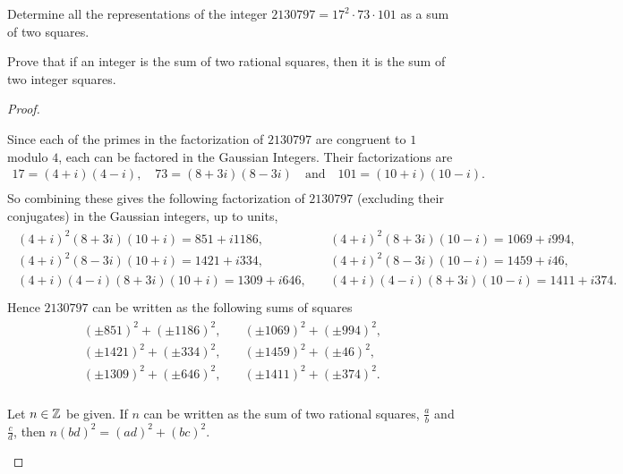 \documentclass[10pt]{amsart}
\begin{document}
\begin{thm}
  \begin{alphaenum}
  \item
    Determine all the representations of the integer $2130797 = 17^2 \cdot 73 \cdot 101$ as a sum of two squares.
  \item
    Prove that if an integer is the sum of two rational squares, then it is the sum of two integer squares.
  \end{alphaenum}
  \begin{proof}
    \begin{alphaenum}
    \item
      Since each of the primes in the factorization of $2130797$ are congruent to $1$ modulo $4$, each can be factored in the Gaussian Integers.
      Their factorizations are 
      \begin{align*}
        17 = (4+i)(4-i), \quad  73 = (8+3i)(8-3i) \quad \text{and} \quad 101 = (10+i)(10-i).\\
      \end{align*}
      So combining these gives the following factorization of $2130797$ (excluding their conjugates) in the Gaussian integers, up to units,
      \begin{align*}
        \begin{split}
          (4+i)^2(8+3i)(10+i) =  851 + i1186,& \quad (4+i)^2(8+3i)(10-i) = 1069 + i994,\\
          (4+i)^2(8-3i)(10+i) = 1421 + i334,& \quad (4+i)^2(8-3i)(10-i) = 1459 + i46,\\
          (4+i)(4-i)(8+3i)(10+i) = 1309 + i646,& \quad (4+i)(4-i)(8+3i)(10-i) = 1411 + i374.\\
        \end{split}
      \end{align*}
      Hence $2130797$ can be written as the following sums of squares
      \begin{align*}
        \begin{split}
          (\pm851)^2 + (\pm1186)^2,& \quad  (\pm1069)^2 + (\pm994)^2,\\
          (\pm1421)^2 + (\pm334)^2,& \quad  (\pm1459)^2 + (\pm46)^2,\\
          (\pm1309)^2 + (\pm646)^2,& \quad  (\pm1411)^2 + (\pm374)^2.\\
        \end{split}
      \end{align*}
    \item
      Let $n \in \mathbb{Z}$ be given.
      If $n$ can be written as the sum of two rational squares, $\frac{a}{b}$ and $\frac{c}{d}$, then $n(bd)^2 = (ad)^2 + (bc)^2$.

\end{alphaenum}
\end{proof}
\end{thm}
\end{document}
